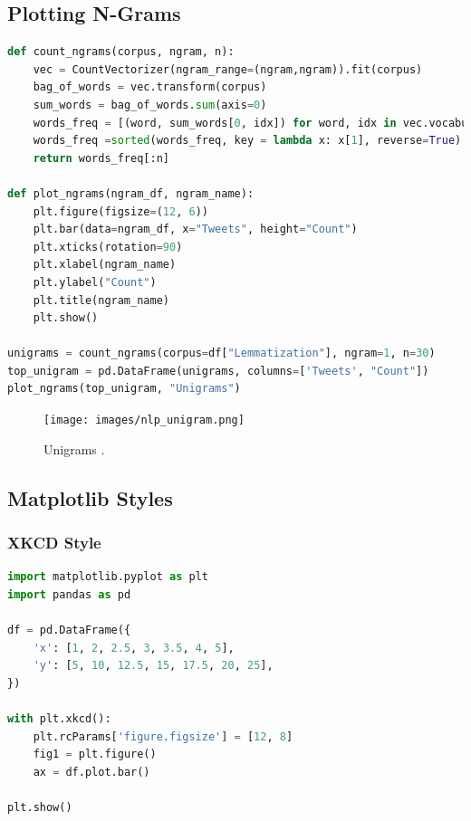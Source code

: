 \newpage

\subsection{Plotting N-Grams}
\begin{lstlisting}[language=Python]
def count_ngrams(corpus, ngram, n):
    vec = CountVectorizer(ngram_range=(ngram,ngram)).fit(corpus)
    bag_of_words = vec.transform(corpus)
    sum_words = bag_of_words.sum(axis=0)
    words_freq = [(word, sum_words[0, idx]) for word, idx in vec.vocabulary_.items()]
    words_freq =sorted(words_freq, key = lambda x: x[1], reverse=True)
    return words_freq[:n]
    
def plot_ngrams(ngram_df, ngram_name):
    plt.figure(figsize=(12, 6))
    plt.bar(data=ngram_df, x="Tweets", height="Count")
    plt.xticks(rotation=90)
    plt.xlabel(ngram_name)
    plt.ylabel("Count")
    plt.title(ngram_name)
    plt.show()
    
unigrams = count_ngrams(corpus=df["Lemmatization"], ngram=1, n=30)
top_unigram = pd.DataFrame(unigrams, columns=['Tweets', "Count"])
plot_ngrams(top_unigram, "Unigrams")
\end{lstlisting}

\begin{figure}[ht]
    \centering
    \texttt{[image: images/nlp\_unigram.png]}
    \caption{Unigrams .}
    \label{fig:enter-label}
\end{figure}

\newpage

\subsection{Matplotlib Styles}
\subsubsection{XKCD Style}
\begin{lstlisting}[language=Python]
import matplotlib.pyplot as plt
import pandas as pd

df = pd.DataFrame({
    'x': [1, 2, 2.5, 3, 3.5, 4, 5],
    'y': [5, 10, 12.5, 15, 17.5, 20, 25],
})
 
with plt.xkcd():
    plt.rcParams['figure.figsize'] = [12, 8]
    fig1 = plt.figure()
    ax = df.plot.bar()

plt.show()
\end{lstlisting}

